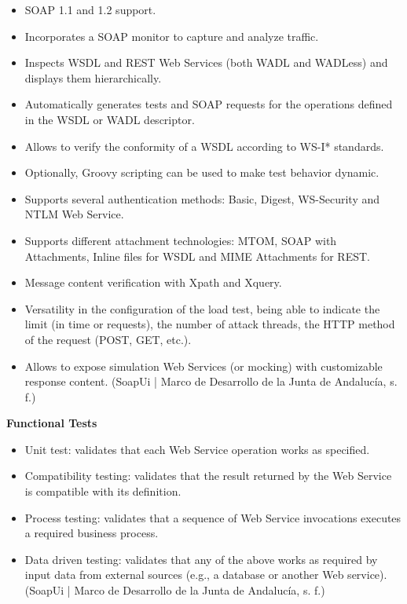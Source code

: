 \documentclass{article}
\begin{document}
	\begin{itemize}
		\item SOAP 1.1 and 1.2 support.
		\item Incorporates a SOAP monitor to capture and analyze traffic.
		\item Inspects WSDL and REST Web Services (both WADL and WADLess) and displays them hierarchically.
		\item Automatically generates tests and SOAP requests for the operations defined in the WSDL or WADL descriptor.
		\item Allows to verify the conformity of a WSDL according to WS-I* standards.
		\item Optionally, Groovy scripting can be used to make test behavior dynamic.
		\item Supports several authentication methods: Basic, Digest, WS-Security and NTLM Web Service.
		\item Supports different attachment technologies: MTOM, SOAP with Attachments, Inline files for WSDL and MIME Attachments for REST.
		\item Message content verification with Xpath and Xquery.
		\item Versatility in the configuration of the load test, being able to indicate the limit (in time or requests), the number of attack threads, the HTTP method of the request (POST, GET, etc.).
		\item Allows to expose simulation Web Services (or mocking) with customizable response content. (SoapUi | Marco de Desarrollo de la Junta de Andalucía, s. f.)
	\end{itemize}
	
	\textbf{Functional Tests}
	
	\begin{itemize}
		\item Unit test: validates that each Web Service operation works as specified.
		\item Compatibility testing: validates that the result returned by the Web Service is compatible with its definition.
		\item Process testing: validates that a sequence of Web Service invocations executes a required business process.
		\item Data driven testing: validates that any of the above works as required by input data from external sources (e.g., a database or another Web service). (SoapUi | Marco de Desarrollo de la Junta de Andalucía, s. f.)
	\end{itemize}
	
\end{document}
